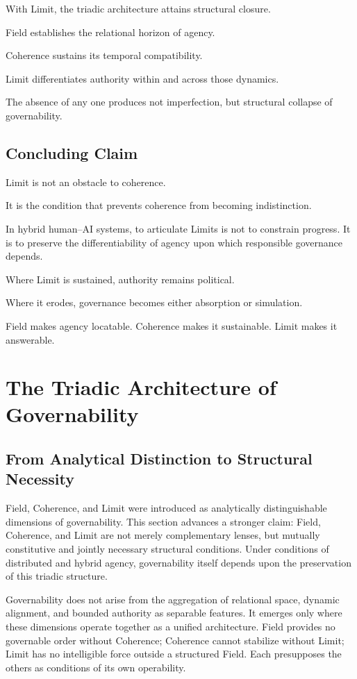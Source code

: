 \documentclass[12pt]{article}
\begin{document}
With Limit, the triadic architecture attains structural closure.

Field establishes the relational horizon of agency.

Coherence sustains its temporal compatibility.

Limit differentiates authority within and across those dynamics.

The absence of any one produces not imperfection, but structural collapse of governability.

\subsection{Concluding Claim}


Limit is not an obstacle to coherence.

It is the condition that prevents coherence from becoming indistinction.

In hybrid human–AI systems, to articulate Limits is not to constrain progress. It is to preserve the differentiability of agency upon which responsible governance depends.

Where Limit is sustained, authority remains political.

Where it erodes, governance becomes either absorption or simulation.

Field makes agency locatable.
Coherence makes it sustainable.
Limit makes it answerable.

\section{The Triadic Architecture of Governability}


\subsection{From Analytical Distinction to Structural Necessity}


Field, Coherence, and Limit were introduced as analytically distinguishable dimensions of governability. This section advances a stronger claim: Field, Coherence, and Limit are not merely complementary lenses, but mutually constitutive and jointly necessary structural conditions. Under conditions of distributed and hybrid agency, governability itself depends upon the preservation of this triadic structure.

Governability does not arise from the aggregation of relational space, dynamic alignment, and bounded authority as separable features. It emerges only where these dimensions operate together as a unified architecture. Field provides no governable order without Coherence; Coherence cannot stabilize without Limit; Limit has no intelligible force outside a structured Field. Each presupposes the others as conditions of its own operability.
\end{document}
